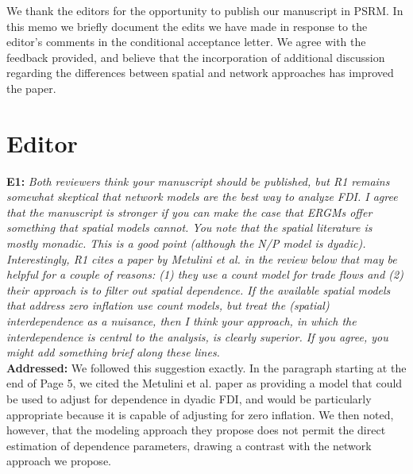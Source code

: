 \documentclass[a4paper,11pt]{texMemo}
\begin{document}
\maketitle

\noindent We thank the editors for the opportunity to publish our manuscript in PSRM. In this memo
we briefly document the edits we have made in response to the editor's comments in the conditional acceptance letter. We agree with the feedback provided, and believe that the incorporation of additional discussion regarding the differences between spatial and network approaches has improved the paper.


\section*{Editor}

\noindent \textbf{E1:} \emph{ Both reviewers think your manuscript should be published, but R1 remains somewhat skeptical that network models are the best way to analyze FDI. I agree that the manuscript is stronger if you can make the case that ERGMs offer something that spatial models cannot. You note that the spatial literature is mostly monadic. This is a good point (although the N/P model is dyadic). Interestingly, R1 cites a paper by Metulini et al. in the review below that may be helpful for a couple of reasons: (1) they use a count model for trade flows and (2) their approach is to filter out spatial dependence. If the available spatial models that address zero inflation use count models, but treat the (spatial) interdependence as a nuisance, then I think your approach, in which the interdependence is central to the analysis, is clearly superior. If you agree, you might add something brief along these lines.  }\\

\noindent \textbf{Addressed:} We followed this suggestion exactly. In the paragraph starting at the end of Page 5, we cited the Metulini et al. paper as providing a model that could be used to adjust for dependence in dyadic FDI, and would be particularly appropriate because it is capable of adjusting for zero inflation. We then noted, however, that the modeling approach they propose does not permit the direct estimation of dependence parameters, drawing a contrast with the network approach we propose.  \\
\end{document}
